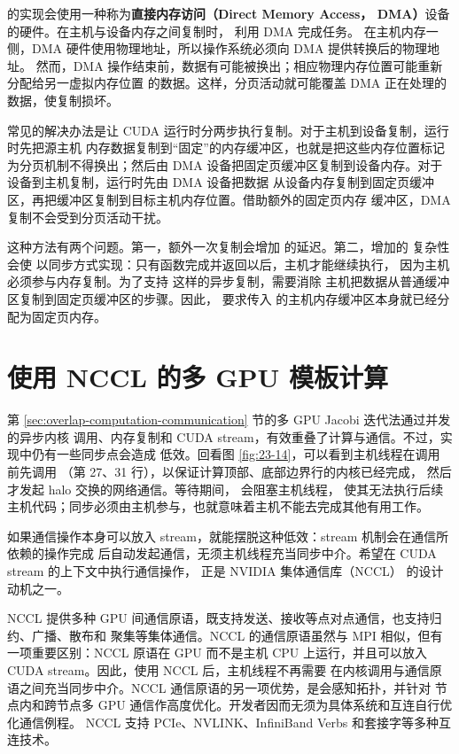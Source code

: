  的实现会使用一种称为\textbf{直接内存访问（Direct Memory Access，
DMA）}设备的硬件。在主机与设备内存之间复制时， 利用 DMA 完成任务。
在主机内存一侧，DMA 硬件使用物理地址，所以操作系统必须向 DMA 提供转换后的物理地址。
然而，DMA 操作结束前，数据有可能被换出；相应物理内存位置可能重新分配给另一虚拟内存位置
的数据。这样，分页活动就可能覆盖 DMA 正在处理的数据，使复制损坏。

常见的解决办法是让 CUDA 运行时分两步执行复制。对于主机到设备复制，运行时先把源主机
内存数据复制到“固定”的内存缓冲区，也就是把这些内存位置标记为分页机制不得换出；然后由
DMA 设备把固定页缓冲区复制到设备内存。对于设备到主机复制，运行时先由 DMA 设备把数据
从设备内存复制到固定页缓冲区，再把缓冲区复制到目标主机内存位置。借助额外的固定页内存
缓冲区，DMA 复制不会受到分页活动干扰。

这种方法有两个问题。第一，额外一次复制会增加  的延迟。第二，增加的
复杂性会使  以同步方式实现：只有函数完成并返回以后，主机才能继续执行，
因为主机必须参与内存复制。为了支持  这样的异步复制，需要消除
主机把数据从普通缓冲区复制到固定页缓冲区的步骤。因此， 要求传入
的主机内存缓冲区本身就已经分配为固定页内存。

\section{使用 NCCL 的多 GPU 模板计算}
\label{sec:multi-gpu-nccl}

第 \ref{sec:overlap-computation-communication} 节的多 GPU Jacobi 迭代法通过并发的异步内核
调用、内存复制和 CUDA stream，有效重叠了计算与通信。不过，实现中仍有一些同步点会造成
低效。回看图 \ref{fig:23-14}，可以看到主机线程在调用  前先调用
（第 27、31 行），以保证计算顶部、底部边界行的内核已经完成，
然后才发起 halo 交换的网络通信。等待期间， 会阻塞主机线程，
使其无法执行后续主机代码；同步必须由主机参与，也就意味着主机不能去完成其他有用工作。

如果通信操作本身可以放入 stream，就能摆脱这种低效：stream 机制会在通信所依赖的操作完成
后自动发起通信，无须主机线程充当同步中介。希望在 CUDA stream 的上下文中执行通信操作，
正是 NVIDIA 集体通信库（NCCL）\cite{ch23-nccl} 的设计动机之一。

NCCL 提供多种 GPU 间通信原语，既支持发送、接收等点对点通信，也支持归约、广播、散布和
聚集等集体通信。NCCL 的通信原语虽然与 MPI 相似，但有一项重要区别：NCCL 原语在 GPU
而不是主机 CPU 上运行，并且可以放入 CUDA stream。因此，使用 NCCL 后，主机线程不再需要
在内核调用与通信原语之间充当同步中介。NCCL 通信原语的另一项优势，是会感知拓扑，并针对
节点内和跨节点多 GPU 通信作高度优化。开发者因而无须为具体系统和互连自行优化通信例程。
NCCL 支持 PCIe、NVLINK、InfiniBand Verbs 和套接字等多种互连技术。

